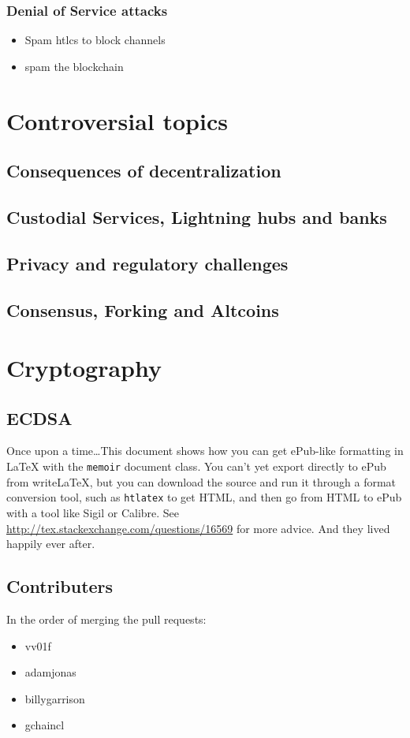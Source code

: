 \documentclass[ebook,12pt,oneside,openany]{memoir}
\begin{document}
\subsection{Denial of Service attacks}
\begin{itemize}
\item Spam htlcs to block channels
\item spam the blockchain
\end{itemize}
\chapter{Controversial topics}
\section{Consequences of decentralization}
\section{Custodial Services, Lightning hubs and banks}
\section{Privacy and regulatory challenges}
\section{Consensus, Forking and Altcoins}


\appendix
\chapter{Cryptography}
\section{ECDSA}

Once upon a time\ldots This document shows how you can get ePub-like formatting in \LaTeX{} with the \verb|memoir| document class. You can't yet export directly to ePub from writeLaTeX, but you can download the source and run it through a format conversion tool, such as \verb|htlatex| to get HTML, and then go from HTML to ePub with a tool like Sigil or Calibre. See \url{http://tex.stackexchange.com/questions/16569} for more advice. And they lived happily ever after.

\appendix
\section{Contributers}
In the order of merging the pull requests:
\begin{itemize}
\item vv01f
\item adamjonas
\item billygarrison
\item gchaincl
\end{itemize}
\end{document}

